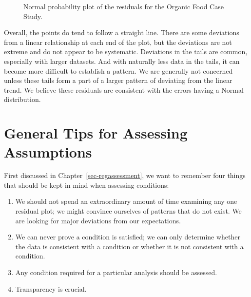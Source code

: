 \documentclass[
  letterpaper,
  DIV=11,
  numbers=noendperiod]{scrreprt}
\providecommand{\tightlist}{%
  \setlength{\itemsep}{0pt}\setlength{\parskip}{0pt}}\usepackage{longtable,booktabs,array}
\theoremstyle{plain}
\theoremstyle{definition}
\theoremstyle{definition}
\theoremstyle{remark}
\begin{document}
\begin{figure}


\caption{\label{fig-anovaassessment-normal-organic}Normal probability
plot of the residuals for the Organic Food Case Study.}

\end{figure}%

Overall, the points do tend to follow a straight line. There are some
deviations from a linear relationship at each end of the plot, but the
deviations are not extreme and do not appear to be systematic.
Deviations in the tails are common, especially with larger datasets. And
with naturally less data in the tails, it can become more difficult to
establish a pattern. We are generally not concerned unless these tails
form a part of a larger pattern of deviating from the linear trend. We
believe these residuals are consistent with the errors having a Normal
distribution.

\section{General Tips for Assessing
Assumptions}\label{general-tips-for-assessing-assumptions-1}

First discussed in Chapter~\ref{sec-regassessment}, we want to remember
four things that should be kept in mind when assessing conditions:

\begin{enumerate}
\def\labelenumi{\arabic{enumi}.}
\tightlist
\item
  We should not spend an extraordinary amount of time examining any one
  residual plot; we might convince ourselves of patterns that do not
  exist. We are looking for major deviations from our expectations.
\item
  We can never prove a condition is satisfied; we can only determine
  whether the data is consistent with a condition or whether it is not
  consistent with a condition.
\item
  Any condition required for a particular analysis should be assessed.
\item
  Transparency is crucial.
\end{enumerate}
\end{document}
